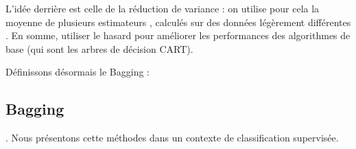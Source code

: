 \documentclass[11pt]{article}
\begin{document}
L’idée derrière est celle de la réduction de variance : on utilise pour cela la moyenne de plusieurs estimateurs , calculés sur des données légèrement différentes .
En somme, utiliser le hasard pour améliorer les performances des algorithmes de base (qui sont les arbres de décision CART).\par

Définissons désormais le Bagging :

\subsection{Bagging}

.
Nous présentons cette  méthodes dans un contexte de classification supervisée.\\
\end{document}
